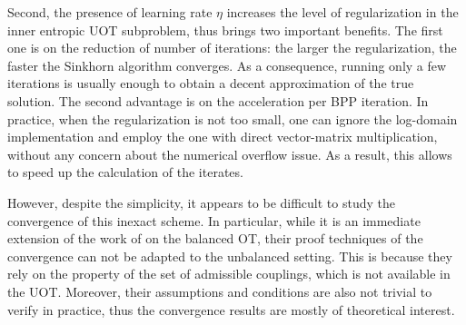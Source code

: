 Second, the presence of learning rate $\eta$
increases the level of regularization in the inner entropic UOT subproblem,
thus brings two important benefits. The first one is on the reduction of number of iterations:
the larger the regularization, the faster the Sinkhorn algorithm converges. As a consequence,
running only a few iterations is usually enough to obtain a decent approximation of
the true solution. The second advantage is on the acceleration per BPP iteration. In practice,
when the regularization is not too small, one can ignore the log-domain implementation
and employ the one with direct vector-matrix multiplication,
without any concern about the numerical overflow issue.
As a result, this allows to speed up the calculation of the iterates.

However, despite the simplicity,
it appears to be difficult to study the convergence of this inexact scheme.
In particular, while it is an immediate extension of the work of \citet{Xie20} on the balanced OT,
their proof techniques of the convergence can not be adapted to the unbalanced setting.
This is because they rely on the property of the set of admissible couplings,
which is not available in the UOT. Moreover, their assumptions and conditions are also
not trivial to verify in practice, thus the convergence results are mostly of theoretical interest.



